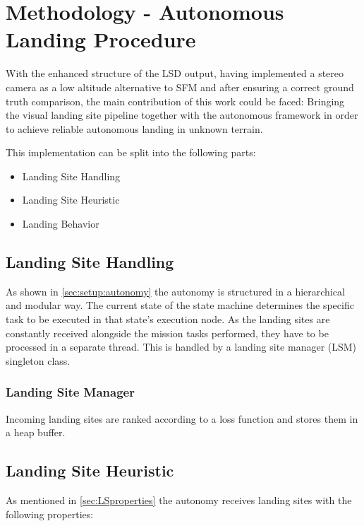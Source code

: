 \chapter{Methodology - Autonomous Landing Procedure}\label{chapter:core_implementation}


With the enhanced structure of the LSD output, having implemented a stereo camera as a low altitude alternative to SFM and after ensuring a correct ground truth comparison, the main contribution of this work could be faced: Bringing the visual landing site pipeline together with the autonomous framework in order to achieve reliable autonomous landing in unknown terrain.

This implementation can be split into the following parts:
\begin{itemize}
    \item Landing Site Handling
    \item Landing Site Heuristic
    \item Landing Behavior
\end{itemize}

\section{Landing Site Handling}

As shown in \cref{sec:setup:autonomy} the autonomy is structured in a hierarchical and modular way. The current state of the state machine determines the specific task to be executed in that state's execution node. As the landing sites are constantly received alongside the mission tasks performed, they have to be processed in a separate thread. This is handled by a landing site manager (LSM) singleton class.

\subsection{Landing Site Manager}

Incoming landing sites are ranked according to a loss function and stores them in a heap buffer.

\section{Landing Site Heuristic}\label{subsubsec:LandingSiteHeuristic}

As mentioned in \cref{sec:LSproperties} the autonomy receives landing sites with the following properties:

